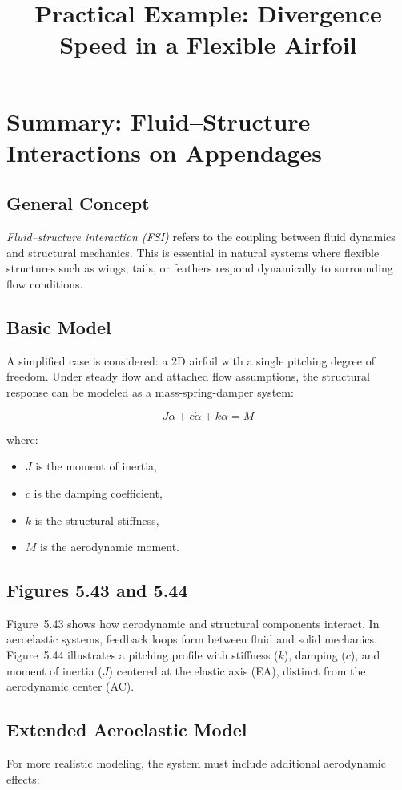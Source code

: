 \documentclass{article}
\title{Practical Example: Divergence Speed in a Flexible Airfoil}
\author{}
\date{}
\begin{document}
\maketitle

\section*{Summary: Fluid--Structure Interactions on Appendages}

\subsection*{General Concept}
\textit{Fluid--structure interaction (FSI)} refers to the coupling between fluid dynamics and structural mechanics. This is essential in natural systems where flexible structures such as wings, tails, or feathers respond dynamically to surrounding flow conditions.

\subsection*{Basic Model}
A simplified case is considered: a 2D airfoil with a single pitching degree of freedom. Under steady flow and attached flow assumptions, the structural response can be modeled as a mass-spring-damper system:

\[
J \ddot{\alpha} + c \dot{\alpha} + k \alpha = M
\]

where:
\begin{itemize}
  \item $J$ is the moment of inertia,
  \item $c$ is the damping coefficient,
  \item $k$ is the structural stiffness,
  \item $M$ is the aerodynamic moment.
\end{itemize}

\subsection*{Figures 5.43 and 5.44}
Figure~5.43 shows how aerodynamic and structural components interact. In aeroelastic systems, feedback loops form between fluid and solid mechanics. Figure~5.44 illustrates a pitching profile with stiffness ($k$), damping ($c$), and moment of inertia ($J$) centered at the elastic axis (EA), distinct from the aerodynamic center (AC).

\subsection*{Extended Aeroelastic Model}
For more realistic modeling, the system must include additional aerodynamic effects:
\end{document}
